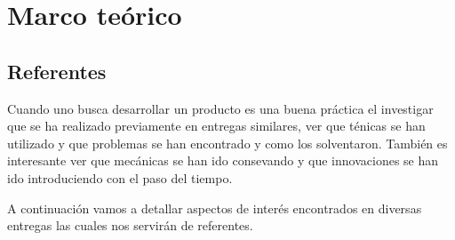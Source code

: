 \chapter{Marco teórico}
\label{Marco_teorico}




\section{Referentes}
Cuando uno busca desarrollar un producto es una buena práctica el investigar que se ha realizado
previamente en entregas similares, ver que ténicas se han utilizado y que problemas se han
encontrado y como los solventaron. También es interesante ver que mecánicas se han ido consevando
y que innovaciones se han ido introduciendo con el paso del tiempo.

A continuación vamos a detallar aspectos de interés encontrados en diversas entregas
las cuales nos servirán de referentes.

